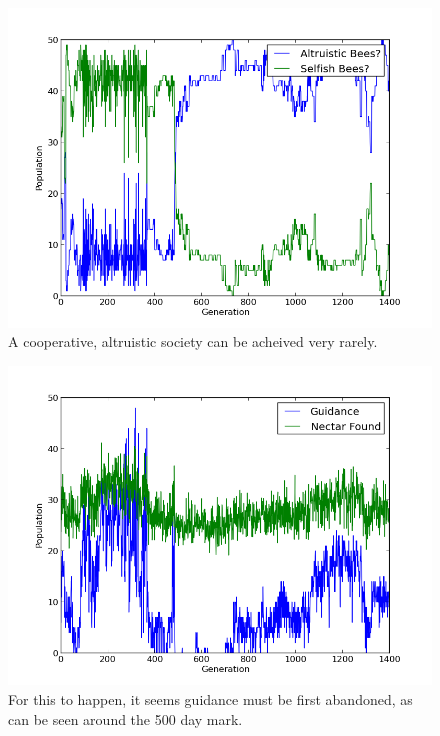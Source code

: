 \documentclass[11pt]{article}
\begin{document}
			\begin{figure}[tbph!]
				\begin{center}
					\includegraphics[scale=.5]{results/gossip_alt_comp.png}
				\end{center}
				\caption{A cooperative, altruistic society can be acheived very rarely.}
				\label{fig:altruistic_composition}
			\end{figure}

                        \begin{figure}[tbph!]
				\begin{center}
					\includegraphics[scale=.5]{results/gossip_alt_tell.png}
				\end{center}
                \caption{For this to happen, it seems guidance must be first abandoned, as can be seen around the 500 day mark.}
				\label{fig:altruistic_guidance}
			\end{figure}
\end{document}
